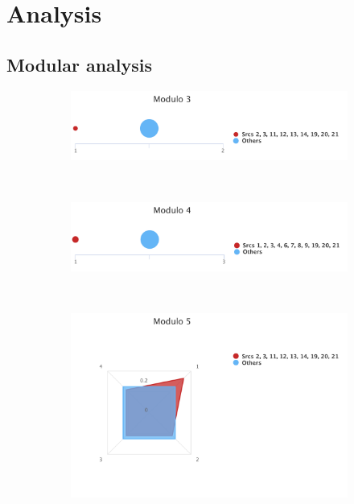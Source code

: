 \chapter{Analysis}

\label{appendix-analysis}

\section{Modular analysis}
\label{appendix-modular-analysis}

\begin{figure}[ht]
\centering
\begin{subfigure}{0.9\textwidth}
	\includegraphics[width=\linewidth]{tex/images/analysis/mod3}
\end{subfigure}\\

\begin{subfigure}{0.9\textwidth}
	\includegraphics[width=\linewidth]{tex/images/analysis/mod4}
\end{subfigure}\\

\begin{subfigure}{0.9\textwidth}
	\includegraphics[width=\linewidth]{tex/images/analysis/mod5}
\end{subfigure}
\end{figure}

